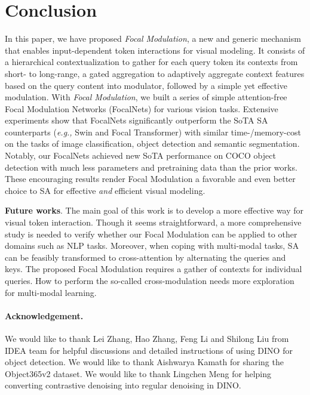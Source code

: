\documentclass{article}
\newcommand{\eg}[0]{\emph{e.g., }}
\begin{document}
%
 
\section{Conclusion}
\vspace{-3pt}
In this paper, we have proposed \emph{Focal Modulation}, a new and generic mechanism that enables input-dependent token interactions for visual modeling. It consists of a hierarchical contextualization to gather for each query token its contexts from short- to long-range, a gated aggregation to adaptively aggregate context features based on the query content into modulator, followed by a simple yet effective modulation. With \emph{Focal Modulation}, we built a series of simple attention-free Focal Modulation Networks (FocalNets) for various vision tasks. Extensive experiments show that FocalNets significantly outperform the SoTA SA counterparts (\eg Swin and Focal Transformer) with similar time-/memory-cost on the tasks of image classification, object detection and semantic segmentation. Notably, our FocalNets achieved new SoTA performance on COCO object detection with much less parameters and pretraining data than the prior works. These encouraging results render Focal Modulation a favorable and even better choice to SA for effective \emph{and} efficient visual modeling.

\textbf{Future works}. The main goal of this work is to develop a more effective way for visual token interaction. Though it seems straightforward, a more comprehensive study is needed to verify whether our Focal Modulation can be applied to other domains such as NLP tasks. Moreover, when coping with multi-modal tasks, SA can be feasibly transformed to cross-attention by alternating the queries and keys. The proposed Focal Modulation requires a gather of contexts for individual queries. How to perform the so-called cross-modulation needs more exploration for multi-modal learning.

\paragraph{Acknowledgement.} We would like to thank Lei Zhang, Hao Zhang, Feng Li and Shilong Liu from IDEA team for helpful discussions and detailed instructions of using DINO for object detection. We would like to thank Aishwarya Kamath for sharing the Object365v2 dataset. We would like to thank Lingchen Meng for helping converting contrastive denoising into regular denoising in DINO.
\end{document}
